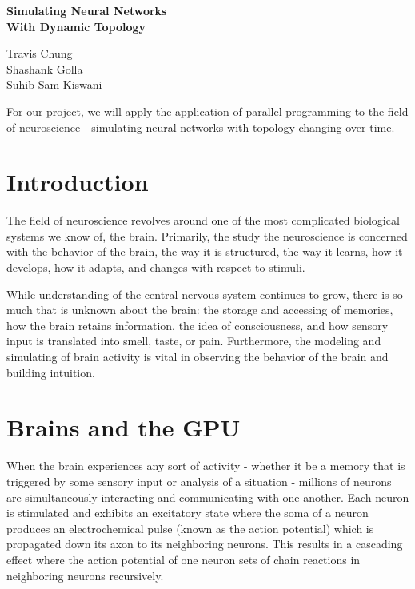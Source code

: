 \documentclass[a4paper]{article}
\begin{document}
\begin{center}
{\huge\bf Simulating Neural Networks}\\
\smallskip
{\huge\bf With Dynamic Topology}
\smallskip

{\large Travis Chung}\\
\smallskip
{\large Shashank Golla }\\
\smallskip
{\large Suhib Sam Kiswani}\\

\bigskip

For our project, we will apply the application of parallel programming to the field of neuroscience - simulating neural networks with topology changing over time.
\end{center}



\section{Introduction}

The field of neuroscience revolves around one of the most complicated biological systems we know of, the brain. Primarily, the study the neuroscience is concerned with the behavior of the brain, the way it is structured, the way it learns, how it develops, how it adapts, and changes with respect to stimuli.

While understanding of the central nervous system continues to grow, there is so much that is unknown about the brain: the storage and accessing of memories, how the brain retains information, the idea of consciousness, and how sensory input is translated into smell, taste, or pain.  Furthermore, the modeling and simulating of brain activity is vital in observing the behavior of the brain and building intuition.

\section{Brains and the GPU}

When the brain experiences any sort of activity - whether it be a memory that is triggered by some sensory input or analysis of a situation - millions of neurons are simultaneously interacting and communicating with one another. Each neuron is stimulated and exhibits an excitatory state where the soma of a neuron produces an electrochemical pulse (known as the action potential) which is propagated down its axon to its neighboring neurons. This results in a cascading effect where the action potential of one neuron sets of chain reactions in neighboring neurons recursively.
\end{document}
